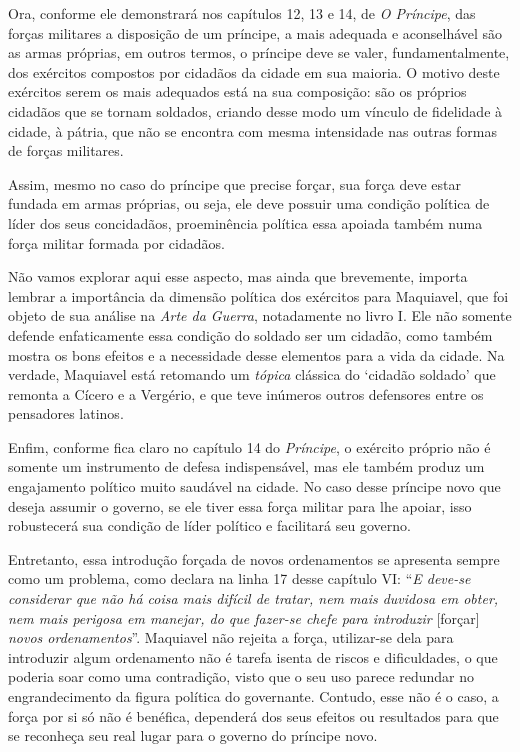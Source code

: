 Ora, conforme ele demonstrará nos capítulos 12, 13 e 14, de \emph{O
Príncipe}, das forças militares a disposição de um príncipe, a mais
adequada e aconselhável são as armas próprias, em outros termos, o
príncipe deve se valer, fundamentalmente, dos exércitos compostos por
cidadãos da cidade em sua maioria. O motivo deste exércitos serem os
mais adequados está na sua composição: são os próprios cidadãos que se
tornam soldados, criando desse modo um vínculo de fidelidade à cidade, à
pátria, que não se encontra com mesma intensidade nas outras formas de
forças militares.

Assim, mesmo no caso do príncipe que precise forçar, sua força deve
estar fundada em armas próprias, ou seja, ele deve possuir uma condição
política de líder dos seus concidadãos, proeminência política essa
apoiada também numa força militar formada por cidadãos.

Não vamos explorar aqui esse aspecto, mas ainda que brevemente, importa
lembrar a importância da dimensão política dos exércitos para Maquiavel,
que foi objeto de sua análise na \emph{Arte da Guerra}, notadamente no
livro I. Ele não somente defende enfaticamente essa condição do soldado
ser um cidadão, como também mostra os bons efeitos e a necessidade desse
elementos para a vida da cidade. Na verdade, Maquiavel está retomando um
\emph{tópica} clássica do `cidadão soldado' que remonta a Cícero e a
Vergério, e que teve inúmeros outros defensores entre os pensadores
latinos.

Enfim, conforme fica claro no capítulo 14 do \emph{Príncipe}, o exército
próprio não é somente um instrumento de defesa indispensável, mas ele
também produz um engajamento político muito saudável na cidade. No caso
desse príncipe novo que deseja assumir o governo, se ele tiver essa
força militar para lhe apoiar, isso robustecerá sua condição de líder
político e facilitará seu governo.

Entretanto, essa introdução forçada de novos ordenamentos se apresenta
sempre como um problema, como declara na linha 17 desse capítulo VI:
``\emph{E deve-se considerar que não há coisa mais difícil de tratar,
nem mais duvidosa em obter, nem mais perigosa em manejar, do que
fazer-se chefe para introduzir} {[}forçar{]} \emph{novos
ordenamentos}''. Maquiavel não rejeita a força, utilizar-se dela para
introduzir algum ordenamento não é tarefa isenta de riscos e
dificuldades, o que poderia soar como uma contradição, visto que o seu
uso parece redundar no engrandecimento da figura política do governante.
Contudo, esse não é o caso, a força por si só não é benéfica, dependerá
dos seus efeitos ou resultados para que se reconheça seu real lugar para
o governo do príncipe novo.

